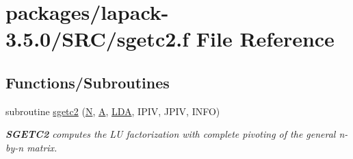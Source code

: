 \hypertarget{sgetc2_8f}{}\section{packages/lapack-\/3.5.0/\+S\+R\+C/sgetc2.f File Reference}
\label{sgetc2_8f}
\subsection*{Functions/\+Subroutines}
\begin{DoxyCompactItemize}
\item 
subroutine \hyperlink{group__realGEauxiliary_gac0fa1757e981d8faef063cc9f4fa09ea}{sgetc2} (\hyperlink{polmisc_8c_a0240ac851181b84ac374872dc5434ee4}{N}, \hyperlink{classA}{A}, \hyperlink{example__user_8c_ae946da542ce0db94dced19b2ecefd1aa}{L\+D\+A}, I\+P\+I\+V, J\+P\+I\+V, I\+N\+F\+O)
\begin{DoxyCompactList}\small\item\em {\bfseries S\+G\+E\+T\+C2} computes the L\+U factorization with complete pivoting of the general n-\/by-\/n matrix. \end{DoxyCompactList}\end{DoxyCompactItemize}
